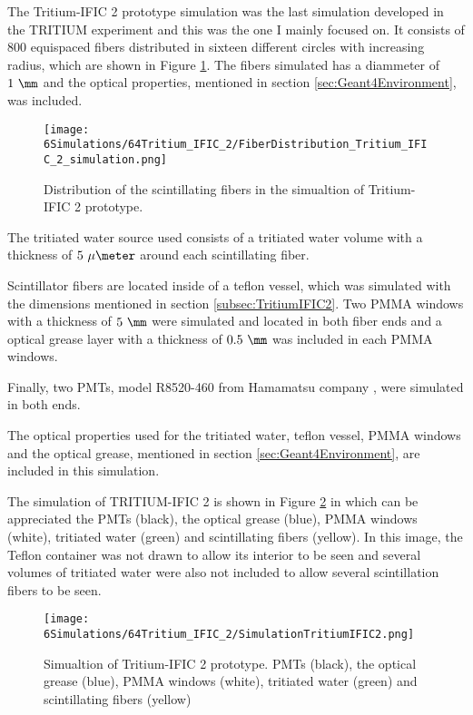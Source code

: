 The Tritium-IFIC 2 prototype simulation was the last simulation developed in the TRITIUM experiment and this was the one I mainly focused on. It consists of $800$ equispaced fibers distributed in sixteen different circles with increasing radius, which are shown in Figure \ref{fig:FibersTritiumIFIC2Simulation}. The fibers simulated has a diammeter of $1~\mm$ and the optical properties, mentioned in section \ref{sec:Geant4Environment}, was included.

\begin{figure}[h]
\centering
\texttt{[image: 6Simulations/64Tritium\_IFIC\_2/FiberDistribution\_Tritium\_IFIC\_2\_simulation.png]}
\caption{Distribution of the scintillating fibers in the simualtion of Tritium-IFIC 2 prototype.\label{fig:FibersTritiumIFIC2Simulation}}
\end{figure}

The tritiated water source used consists of a tritiated water volume with a thickness of $5~\mu\meter$ around each scintillating fiber.

Scintillator fibers are located inside of a teflon vessel, which was simulated with the dimensions mentioned in section \ref{subsec:TritiumIFIC2}. Two PMMA windows with a thickness of $5~\mm$ were simulated and located in both fiber ends and a optical grease layer with a thickness of $0.5~\mm$ was included in each PMMA windows.

Finally, two PMTs, model R8520-460 from Hamamatsu company \cite{DataSheetPMTs}, were simulated in both ends. 

The optical properties used for the tritiated water, teflon vessel, PMMA windows and the optical grease, mentioned in section \ref{sec:Geant4Environment}, are included in this simulation. 

The simulation of TRITIUM-IFIC 2 is shown in Figure \ref{fig:TritiumIFIC2Simulation} in which can be appreciated the PMTs (black), the optical grease (blue), PMMA windows (white), tritiated water (green) and scintillating fibers (yellow). In this image, the Teflon container was not drawn to allow its interior to be seen and several volumes of tritiated water were also not included to allow several scintillation fibers to be seen.

\begin{figure}[h]
\centering
\texttt{[image: 6Simulations/64Tritium\_IFIC\_2/SimulationTritiumIFIC2.png]}
\caption{Simualtion of Tritium-IFIC 2 prototype. PMTs (black), the optical grease (blue), PMMA windows (white), tritiated water (green) and scintillating fibers (yellow) \label{fig:TritiumIFIC2Simulation}}
\end{figure}

